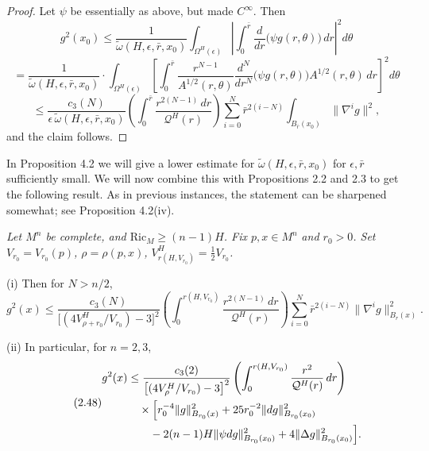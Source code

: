 \begin{proof}
Let $\psi$ be essentially as above, but made $C^\infty$. Then
\begin{equation}
g^2(x_0)\le \frac{1}{\widetilde{\omega}(H,\epsilon,\bar r,x_0)}
\int_{\Omega^H(\epsilon)}\left|\int_0^{\bar r}\frac{d}{dr}\bigl(\psi g(r,\theta)\bigr)\,dr\right|^2 d\theta
\end{equation}
\begin{equation}\tag{2.46}
= \frac{1}{\widetilde{\omega}(H,\epsilon,\bar r,x_0)}
\cdot \int_{\Omega^H(\epsilon)}\left[\int_0^{\bar r}\frac{r^{N-1}}{A^{1/2}(r,\theta)}\frac{d^N}{dr^N}\bigl(\psi g(r,\theta)\bigr)A^{1/2}(r,\theta)\,dr\right]^2 d\theta
\end{equation}
\[
\le \frac{c_3(N)}{\epsilon\,\widetilde{\omega}(H,\epsilon,\bar r,x_0)}
\left(\int_0^{\bar r}\frac{r^{2(N-1)}\,dr}{\mathcal{Q}^H(r)}\right)
\sum_{i=0}^N \bar r^{2(i-N)}\int_{B_{\bar r}(x_0)}\|\nabla^i g\|^2,
\]
and the claim follows.
\end{proof}

In Proposition 4.2 we will give a lower estimate for $\widetilde{\omega}(H,\epsilon,\bar r,x_0)$ for $\epsilon,\bar r$
sufficiently small. We will now combine this with Propositions 2.2 and 2.3 to
get the following result. As in previous instances, the statement can be
sharpened somewhat; see Proposition 4.2(iv).

\begin{theorem}
\label{thm:ricci-lower-bound-pointwise-estimate}

\textit{Let $M^n$ be complete, and $\mathrm{Ric}_M\ge (n-1)H$. Fix $p, x\in M^n$}
\textit{and $r_0>0$. Set $V_{r_0}=V_{r_0}(p)$, $\rho=\rho(p,x)$, $V^H_{r(H,V_{r_0})}=\frac12 V_{r_0}$.}

\noindent (i) Then for $N>n/2$,
\begin{equation}\tag{2.47}
g^2(x)\le \frac{c_3(N)}{\bigl[(4V^H_{\rho+r_0}/V_{r_0})-3\bigr]^2}
\left(\int_0^{r(H,V_{r_0})}\frac{r^{2(N-1)}\,dr}{\mathcal{Q}^H(r)}\right)
\sum_{i=0}^N \bar r^{2(i-N)}\|\nabla^i g\|^2_{B_r(x)}.
\end{equation}

\noindent (ii) In particular, for $n=2,3$,
\begin{equation}\tag{2.48}
\begin{aligned}
g^2(x)&\le \frac{c_3(2)}{\bigl[(4V^H_{\rho}/V_{r_0})-3\bigr]^2}
\left(\int_0^{r(H,V_{r_0})}\frac{r^2}{\mathcal{Q}^H(r)}\,dr\right) \\
&\quad\times\Bigl[r_0^{-4}\|g\|^2_{B_{r_0}(x)}
+25r_0^{-2}\|dg\|^2_{B_{r_0}(x_0)} \\
&\qquad -2(n-1)H\|\psi dg\|^2_{B_{r_0}(x_0)}
+4\|\Delta g\|^2_{B_{r_0}(x_0)}\Bigr].
\end{aligned}
\end{equation}
\end{theorem}

